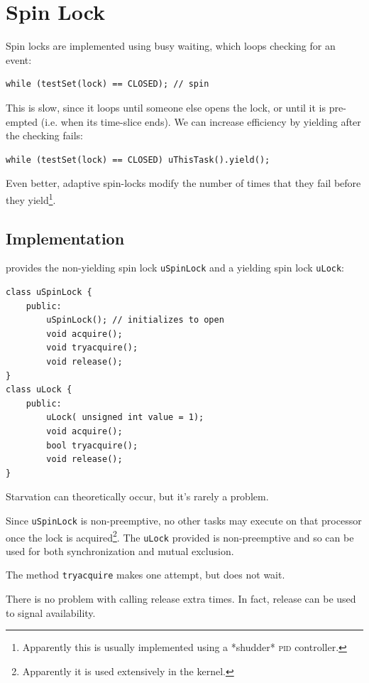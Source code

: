         \section{Spin Lock} %
        \label{sec:spin_lock}
            Spin locks are implemented using busy waiting, which loops checking for an event:
            \begin{lstlisting}
while (testSet(lock) == CLOSED); // spin
            \end{lstlisting}
            This is slow, since it loops until someone else opens the lock, or until it is pre-empted (i.e. when its time-slice ends).
            We can increase efficiency by yielding after the checking fails:
            \begin{lstlisting}
while (testSet(lock) == CLOSED) uThisTask().yield();
            \end{lstlisting}
            Even better, adaptive spin-locks modify the number of times that they fail before they yield\footnote{Apparently this is usually implemented using a *shudder* \textsc{pid} controller.}.
            \subsection{Implementation} %
            \label{sub:implementation}
                \uC provides the non-yielding spin lock \verb|uSpinLock| and a yielding spin lock \verb|uLock|:
                \begin{lstlisting}
class uSpinLock {
    public:
        uSpinLock(); // initializes to open
        void acquire();
        void tryacquire();
        void release();
}
class uLock {
    public:
        uLock( unsigned int value = 1);
        void acquire();
        bool tryacquire();
        void release();
}
                \end{lstlisting}
                Starvation can theoretically occur, but it's rarely a problem.

                Since \verb|uSpinLock| is non-preemptive, no other tasks may execute on that processor once the lock is acquired\footnote{Apparently it is used extensively in the \uC kernel.}.
                The \verb|uLock| provided is non-preemptive and so can be used for both synchronization and mutual exclusion.

                The method \verb|tryacquire| makes one attempt, but does not wait.

                There is no problem with calling release extra times.
                In fact, release can be used to signal availability.
